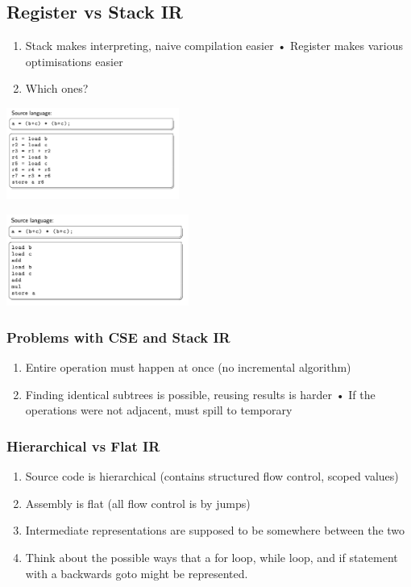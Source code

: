 \documentclass[a4paper]{article}
\theoremstyle{definition}
\begin{document}
  \subsection{Register vs Stack IR}
  \begin{enumerate}
    \item Stack makes interpreting, naive compilation easier • Register makes various optimisations easier
    \item Which ones?
  \end{enumerate}
  \begin{center}
   \includegraphics[height=3cm]{img/Snipaste_2021-04-05_17-25-13.png}
   \end{center}
   
  \begin{center}
   \includegraphics[height=3cm]{img/Snipaste_2021-04-05_17-27-00.png}
   \end{center}

\subsubsection{Problems with CSE and Stack IR}

\begin{enumerate}
  \item Entire operation must happen at once (no incremental algorithm)
  \item Finding identical subtrees is possible, reusing results is harder • If the operations were not adjacent, must spill to temporary
\end{enumerate}

\subsubsection{Hierarchical vs Flat IR}
\begin{enumerate}
  \item Source code is hierarchical (contains structured flow control, scoped values)
  \item Assembly is flat (all flow control is by jumps)
  \item Intermediate representations are supposed to be somewhere
  between the two
  \item Think about the possible ways that a for loop, while loop, and if statement with a backwards goto might be represented.
\end{enumerate}
\end{document}
